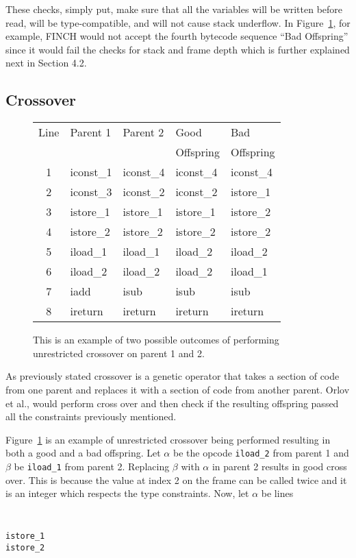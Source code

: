 \documentclass{sig-alternate}
\begin{document}
These checks, simply put, make sure that all the variables will be written before read, will be type-compatible, and will not cause stack underflow\cite{FINCH2:2009}. In Figure~\ref{crossover}, for example, FINCH would not accept the fourth bytecode sequence ``Bad Offspring'' since it would fail the checks for stack and frame depth which is further explained next in Section 4.2.


\subsection{Crossover}

\begin{figure}
\begin{tabular}{|c|l|l|l|l|}

\hline
Line&Parent 1&Parent 2&Good&Bad\\  
 &         &         &Offspring&Offspring\\ \hline
1&iconst\_1&iconst\_4&iconst\_4&iconst\_4\\
2&iconst\_3&iconst\_2&iconst\_2&istore\_1\\
3&istore\_1&istore\_1&istore\_1&istore\_2\\
4&istore\_2&istore\_2&istore\_2&istore\_2\\
5&iload\_1&iload\_1&iload\_2&iload\_2\\
6&iload\_2&iload\_2&iload\_2&iload\_1\\
7&iadd&isub&isub&isub\\
8&ireturn&ireturn&ireturn&ireturn\\
\hline
\end{tabular}
\caption{This is an example of two possible outcomes of performing unrestricted crossover on parent 1 and 2.}
\label{crossover}
  
\end{figure}
As previously stated crossover is a genetic operator that takes a section of code from one parent and replaces it with a section of code from another parent. Orlov et al., would perform cross over and then check if the resulting offspring passed all the constraints previously mentioned.\par 

Figure~\ref{crossover} is an example of unrestricted crossover being performed resulting in both a good and a bad offspring. Let $\alpha$ be the opcode \texttt{iload\_2} from parent 1 and $\beta$ be \texttt{iload\_1} from parent 2. Replacing $\beta$ with $\alpha$ in parent 2 results in good cross over. This is because the value at index 2 on the frame can be called twice and it is an integer which respects the type constraints. Now, let $\alpha$ be lines 
{\tt
\begin{verbatim}
istore_1
istore_2
\end{verbatim}}
\end{document}
